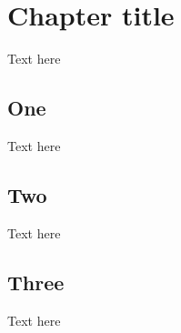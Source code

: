 
\chapter{Chapter title}
Text here
\section{One}
Text here

\section{Two}

Text here
\section{Three}
Text here

\newpage
